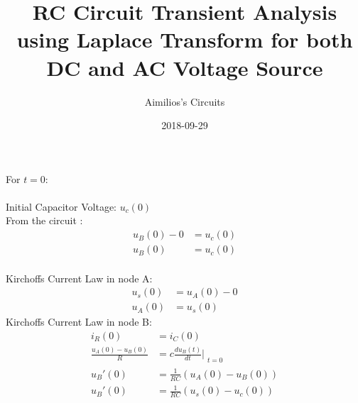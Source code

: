 \documentclass{article}
\title{RC Circuit Transient Analysis using Laplace Transform for both DC and AC Voltage Source }
\date{2018-09-29}
\author{Aimilios's Circuits}
\begin{document}
\maketitle
{}

\section{} For $t=0$:\\
    \\Initial Capacitor Voltage: $u_c(0)$
    \\From the circuit :
    \begin{align}
        u_B(0)-0& = u_c(0)  \nonumber\\
        u_B(0) &= u_c(0)    \label{eq1}
    \end{align}
 \\ Kirchoffs Current Law in node A:
\begin{align}
       u_s(0) &= u_A(0) - 0 \nonumber \\
       u_A(0) &= u_s(0)     \label{eq1}
\end{align}
Kirchoffs Current Law in node B:
\begin{align*}
    i_R(0)&=i_C(0) \\
    \frac{u_A(0)-u_B(0)}{R} &= c \frac{du_B(t)}{dt}|_{\substack{t=0}} \\
    u_B'(0)&=\frac{1}{RC}(u_A(0)-u_B(0))\\
    u_B'(0)&=\frac{1}{RC}(u_s(0)-u_c(0))
\end{align*}
\end{document}
